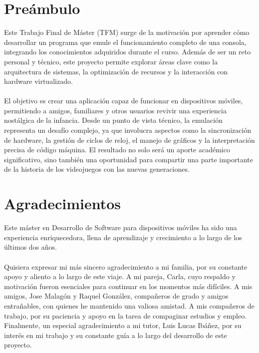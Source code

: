 \chapter*{Preámbulo}
\thispagestyle{empty}

Este Trabajo Final de Máster (TFM) surge de la motivación por aprender cómo desarrollar un programa que emule el funcionamiento completo de una consola, integrando los conocimientos adquiridos durante el curso. Además de ser un reto personal y técnico, este proyecto permite explorar áreas clave como la arquitectura de sistemas, la optimización de recursos y la interacción con hardware virtualizado.
\\\\
El objetivo es crear una aplicación capaz de funcionar en dispositivos móviles, permitiendo a amigos, familiares y otros usuarios revivir una experiencia nostálgica de la infancia. Desde un punto de vista técnico, la emulación representa un desafío complejo, ya que involucra aspectos como la sincronización de hardware, la gestión de ciclos de reloj, el manejo de gráficos y la interpretación precisa de código máquina. El resultado no solo será un aporte académico significativo, sino también una oportunidad para compartir una parte importante de la historia de los videojuegos con las nuevas generaciones.

\cleardoublepage %
\chapter*{Agradecimientos}

\thispagestyle{empty}
\vspace{1cm}

Este máster en Desarrollo de Software para dispositivos móviles ha sido una experiencia enriquecedora, llena de aprendizaje y crecimiento a lo largo de los últimos dos años.
\\\\
Quisiera expresar mi más sincero agradecimiento a mi familia, por su constante apoyo y aliento a lo largo de este viaje. A mi pareja, Carla, cuyo respaldo y motivación fueron esenciales para continuar en los momentos más difíciles. A mis amigos, Jose Malagón y Raquel González, compañeros de grado y amigos entrañables, con quienes he mantenido una valiosa amistad. A mis compañeros de trabajo, por su paciencia y apoyo en la tarea de compaginar estudios y empleo. Finalmente, un especial agradecimiento a mi tutor, Luis Lucas Ibáñez, por su interés en mi trabajo y su constante guía a lo largo del desarrollo de este proyecto.


